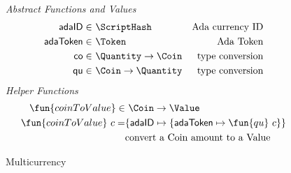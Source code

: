 \begin{figure*}[htb]
  \emph{Abstract Functions and Values}
  \begin{align*}
    \mathsf{adaID} \in& ~\ScriptHash
    & \text{Ada currency ID} \\
    \mathsf{adaToken} \in& ~\Token
    & \text{Ada Token} \\
    \mathsf{co} \in& ~\Quantity \to \Coin
    & \text{type conversion} \\
    \mathsf{qu} \in& ~\Coin \to \Quantity
    & \text{type conversion} \\
  \end{align*}
  \emph{Helper Functions}
  \begin{align*}
    \fun{coinToValue} \in & ~\Coin\to \Value \\
    \fun{coinToValue}~ c = & \{\mathsf{adaID} \mapsto \{\mathsf{adaToken} \mapsto \fun{qu}~c\}\} \\
    &\text{convert a Coin amount to a Value} \\
  \end{align*}
  \caption{Multicurrency}
  \label{fig:defs:functions-helper}
\end{figure*}

\clearpage
